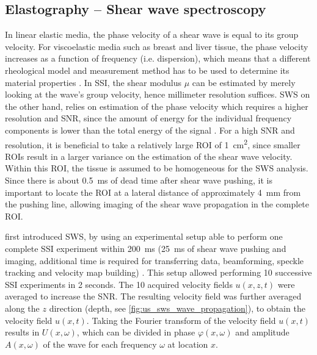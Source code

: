 \subsection{Elastography -- Shear wave spectroscopy}
\label{sec:us_sws} %
In linear elastic media, the phase velocity of a shear wave is equal to its group velocity. For viscoelastic media such as breast and liver tissue, the phase velocity increases as a function of frequency (i.e. dispersion), which means that a different rheological model and measurement method has to be used to determine its material properties \cite{minin_ultrafast_2011}. In SSI, the shear modulus $\mu$ can be estimated by merely looking at the wave's group velocity, hence millimeter resolution suffices. SWS on the other hand, relies on estimation of the phase velocity which requires a higher resolution and SNR, since the amount of energy for the individual frequency components is lower than the total energy of the signal \cite{deffieux_shear_2009}. For a high SNR and resolution, it is beneficial to take a relatively large ROI of \SI{1}{\centi\meter\squared}, since smaller ROIs result in a larger variance on the estimation of the shear wave velocity. Within this ROI, the tissue is assumed to be homogeneous for the SWS analysis. Since there is about \SI{0.5}{\milli\second} of dead time after shear wave pushing, it is important to locate the ROI at a lateral distance of approximately \SI{4}{\milli\meter} from the pushing line, allowing imaging of the shear wave propagation in the complete ROI. 

\citeauthor{deffieux_shear_2009} first introduced SWS, by using an experimental setup able to perform one complete SSI experiment within \SI{200}{\milli\second} (\SI{25}{\milli\second} of shear wave pushing and imaging, additional time is required for transferring data, beamforming, speckle tracking and velocity map building) \cite{deffieux_shear_2009}. This setup allowed performing 10 successive SSI experiments in 2 seconds. The 10 acquired velocity fields $u(x,z,t)$ were averaged to increase the SNR. The resulting velocity field was further averaged along the $z$ direction (depth, see \autoref{fig:us_sws_wave_propagation}), to obtain the velocity field $u(x,t)$. Taking the Fourier transform of the velocity field $u(x,t)$ results in $U(x,\omega)$, which can be divided in phase $\varphi(x,\omega)$ and amplitude $A(x,\omega)$ of the wave for each frequency $\omega$ at location $x$. 


